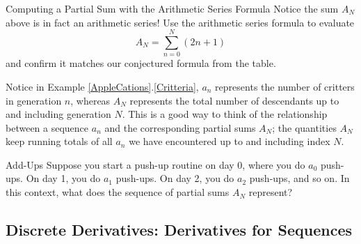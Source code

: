 \begin{exercise}{Computing a Partial Sum with the Arithmetic Series Formula \Coffeecup \Coffeecup}
Notice the sum $A_N$ above is in fact an arithmetic series!  Use the arithmetic series formula to evaluate $$A_N=\sum_{n=0}^N\left(2n+1\right)$$ and confirm it matches our conjectured formula from the table.
\end{exercise}
Notice in Example \ref{AppleCations}.\ref{Critteria}, $a_n$ represents the number of critters in generation $n$, whereas $A_N$ represents the total number of descendants up to and including generation $N$.  This is a good way to think of the relationship between a sequence $a_n$ and the corresponding partial sums $A_N$; the quantities $A_N$ keep running totals of all $a_n$ we have encountered up to and including index $N$.
\begin{exercise}{Add-Ups \Coffeecup}
Suppose you start a push-up routine on day 0, where you do $a_0$ push-ups.  On day 1, you do $a_1$ push-ups. On day 2, you do $a_2$ push-ups, and so on.  In this context, what does the sequence of partial sums $A_N$ represent?  
\end{exercise}
\subsection{Discrete Derivatives: Derivatives for Sequences}

